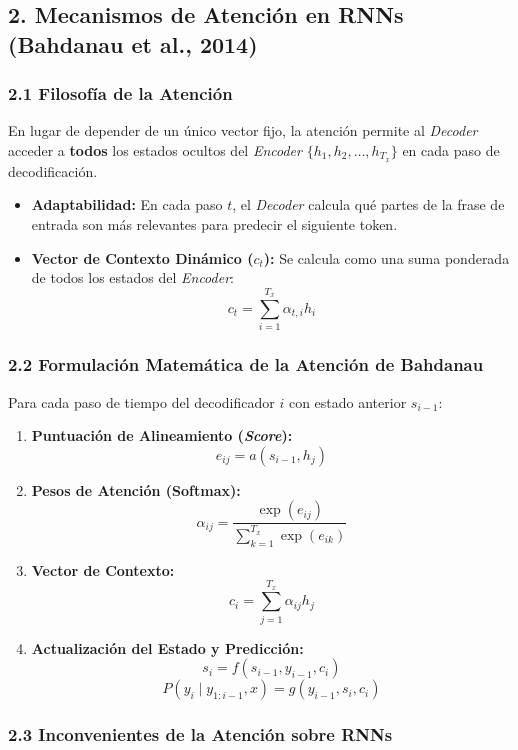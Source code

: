 \subsection{2. Mecanismos de Atención en RNNs (Bahdanau et al., 2014)}

\subsubsection{2.1 Filosofía de la Atención}

En lugar de depender de un único vector fijo, la atención permite al \emph{Decoder} acceder a \textbf{todos} los estados ocultos del \emph{Encoder} $\{h_1, h_2, \dots, h_{T_x}\}$ en cada paso de decodificación.

\begin{itemize}
	\item \textbf{Adaptabilidad:} En cada paso $t$, el \emph{Decoder} calcula qué partes de la frase de entrada son más relevantes para predecir el siguiente token.
	\item \textbf{Vector de Contexto Dinámico ($c_t$):} Se calcula como una suma ponderada de todos los estados del \emph{Encoder}:
	$$c_t = \sum_{i=1}^{T_x} \alpha_{t,i} h_i$$
\end{itemize}

\subsubsection{2.2 Formulación Matemática de la Atención de Bahdanau}

Para cada paso de tiempo del decodificador $i$ con estado anterior $s_{i-1}$:
\begin{enumerate}
	\item \textbf{Puntuación de Alineamiento (\emph{Score}):} 
	$$e_{ij} = a(s_{i-1}, h_j)$$
	\item \textbf{Pesos de Atención (Softmax):} 
	$$\alpha_{ij} = \frac{\exp(e_{ij})}{\sum_{k=1}^{T_x} \exp(e_{ik})}$$
	\item \textbf{Vector de Contexto:} 
	$$c_i = \sum_{j=1}^{T_x} \alpha_{ij} h_j$$
	\item \textbf{Actualización del Estado y Predicción:} 
	$$s_i = f(s_{i-1}, y_{i-1}, c_i)$$
	$$P(y_i \mid y_{1:i-1}, x) = g(y_{i-1}, s_i, c_i)$$
\end{enumerate}

\subsubsection{2.3 Inconvenientes de la Atención sobre RNNs}


